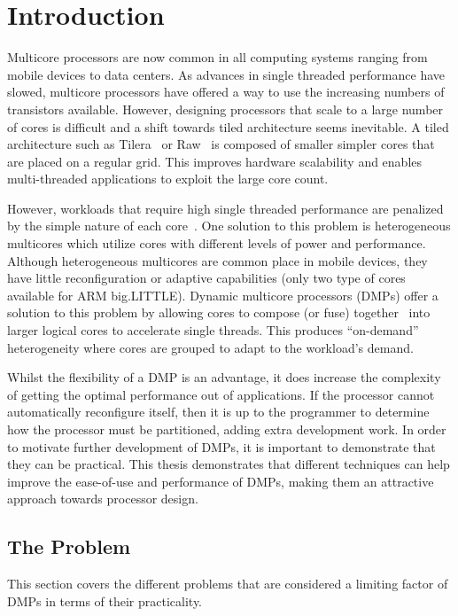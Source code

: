 \chapter{Introduction}
Multicore processors are now common in all computing systems ranging from mobile devices to data centers.
As advances in single threaded performance have slowed, multicore processors have offered a way to use the increasing numbers of transistors available.
However, designing processors that scale to a large number of cores is difficult and a shift towards tiled architecture seems inevitable.
A tiled architecture such as Tilera~\cite{bell2008tile} or Raw~\cite{waingold1997raw} is composed of smaller simpler cores that are placed on a regular grid.
This improves hardware scalability and enables multi-threaded applications to exploit the large core count.

However, workloads that require high single threaded performance are penalized by the simple nature of each core~\cite{eyerman2010amdahl}.
One solution to this problem is heterogeneous multicores which utilize cores with different levels of power and performance.
Although heterogeneous multicores are common place in mobile devices, they have little reconfiguration or adaptive capabilities (\eg only two type of cores available for ARM big.LITTLE).
Dynamic multicore processors (DMPs) offer a solution to this problem by allowing cores to compose (or fuse) together~\cite{ipek2007CoreFusion} into larger logical cores to accelerate single threads.
This produces ``on-demand'' heterogeneity where cores are grouped to adapt to the workload's demand.

Whilst the flexibility of a DMP is an advantage, it does increase the complexity of getting the optimal performance out of applications.
If the processor cannot automatically reconfigure itself, then it is up to the programmer to determine how the processor must be partitioned, adding extra development work.
In order to motivate further development of DMPs, it is important to demonstrate that they can be practical.
This thesis demonstrates that different techniques can help improve the ease-of-use and performance of DMPs, making them an attractive approach towards processor design. 

\section{The Problem}
This section covers the different problems that are considered a limiting factor of DMPs in terms of their practicality.
